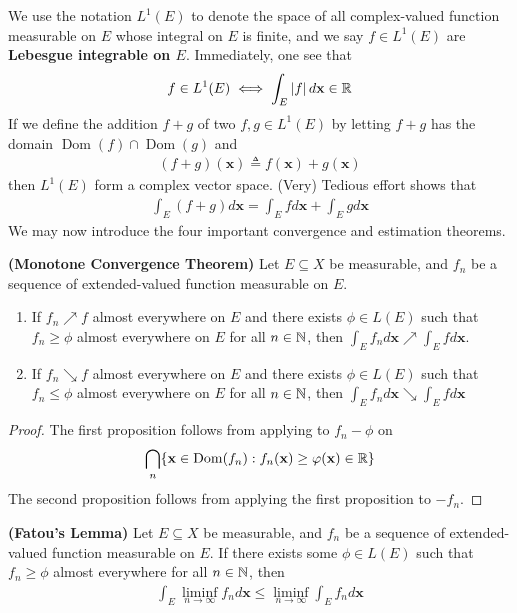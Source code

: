\documentclass{report}
\begin{document}
\begin{mdframed}

We use the notation $L^1(E)$ to denote the space of all complex-valued function measurable on $E$ whose integral on $E$ is finite, and we say $f\in L^1(E)$ are \textbf{Lebesgue integrable on $E$}. Immediately, one see that  
\begin{align*}
f \in L^1(E)\iff \int_E \left|f\right|d\textbf{x}\in\mathbb{R}
\end{align*}
If we define the addition $f+g$ of two $f,g\in L^1(E)$ by letting $f+g$ has the domain  $\operatorname{Dom}(f)\cap \operatorname{Dom}(g)$ and 
\begin{align*}
  (f+g)(\textbf{x})\triangleq f(\textbf{x})+ g(\textbf{x})
\end{align*}
then $L^1(E)$ form a complex vector space. (Very) Tedious effort shows that 
\begin{align*}
\int_E (f+g)d\textbf{x}=\int_E fd\textbf{x}+ \int_E gd\textbf{x}
\end{align*}
We may now introduce the four important convergence and estimation theorems. 
\end{mdframed}
\begin{theorem}
\label{MCT}
\textbf{(Monotone Convergence Theorem)} Let $E\subseteq X$ be measurable, and $f_n$ be a sequence of extended-valued function measurable on $E$.   
\begin{enumerate}[label=(\alph*)]
  \item If $f_n\nearrow f$ almost everywhere on $E$ and there exists  $\phi \in L(E)$ such that $f_n\geq \phi$ almost everywhere on $E$ for all  $n\in\mathbb{N}$, then $\int_E f_nd\textbf{x}\nearrow  \int_E fd\textbf{x}$. 
  \item If $f_n\searrow f$ almost everywhere on  $E$ and there exists  $\phi \in L(E)$ such that $f_n \leq \phi$ almost everywhere on $E$ for all  $n\in\mathbb{N}$, then $\int_E f_nd\textbf{x}\searrow \int_E fd\textbf{x}$
\end{enumerate}
\end{theorem}
\begin{proof}
The first proposition follows from applying  to $f_n - \phi$ on 
\begin{align*}
\bigcap_{n} \{ \textbf{x} \in \operatorname{Dom}(f_n): f_n(\textbf{x})\geq \varphi(\textbf{x})\in\mathbb{R} \}
\end{align*}
The second proposition follows from applying the first proposition to $-f_n$.  
\end{proof}
\begin{theorem}
\label{FL}
\textbf{(Fatou's Lemma)} Let $E\subseteq X$ be measurable, and $f_n$ be a sequence of extended-valued function measurable on $E$. If there exists some $\phi \in L(E)$ such that $f_n\geq \phi $ almost everywhere for all  $n\in\mathbb{N}$, then 
\begin{align*}
\int_E \liminf_{n\to\infty} f_nd\textbf{x}\leq \liminf_{n\to\infty} \int_E f_nd\textbf{x}
\end{align*}
\end{theorem}
\end{document}
